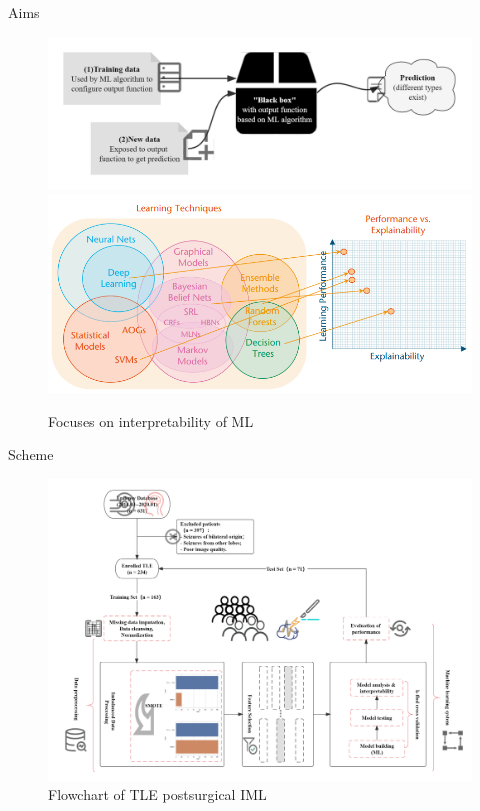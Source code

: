 \documentclass[
  11pt,
  ignorenonframetext,
  fontset=fandol]{beamer}
\begin{document}
\begin{frame}{Aims}
\protect\hypertarget{aims}{}
\begin{figure}

{\centering \includegraphics[width=0.7\linewidth]{images/Black-box} \includegraphics[width=0.8\linewidth]{images/xai} 

}

\caption{Focuses on interpretability of ML}\label{fig:unnamed-chunk-3}
\end{figure}
\end{frame}

\begin{frame}{Scheme}
\protect\hypertarget{scheme}{}
\begin{figure}

{\centering \includegraphics[width=0.85\linewidth]{images/TLE_EML_Flow} 

}

\caption{Flowchart of TLE postsurgical IML}\label{fig:unnamed-chunk-4}
\end{figure}
\end{frame}
\end{document}

